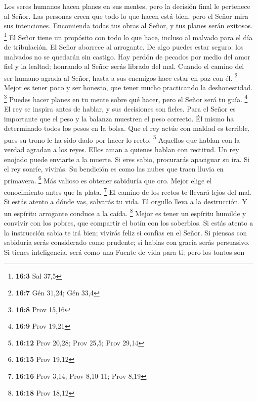  Los seres humanos hacen planes en sus mentes, pero la
decisión final le pertenece al Señor.  Las personas creen
que todo lo que hacen está bien, pero el Señor mira sus intenciones.
 Encomienda todas tus obras al Señor, y tus planes serán
exitosos. \footnote{\textbf{16:3} Sal 37,5}  El Señor tiene
un propósito con todo lo que hace, incluso al malvado para el día de
tribulación.  El Señor aborrece al arrogante. De algo puedes
estar seguro: los malvados no se quedarán sin castigo.  Hay
perdón de pecados por medio del amor fiel y la lealtad; honrando al
Señor serás librado del mal.  Cuando el camino del ser
humano agrada al Señor, hasta a sus enemigos hace estar en paz con él.
\footnote{\textbf{16:7} Gén 31,24; Gén 33,4}  Mejor es tener
poco y ser honesto, que tener mucho practicando la deshonestidad.
\footnote{\textbf{16:8} Prov 15,16}  Puedes hacer planes en
tu mente sobre qué hacer, pero el Señor será tu guía. \footnote{\textbf{16:9}
  Prov 19,21}  El rey se inspira antes de hablar, y sus
decisiones son fieles.  Para el Señor es importante que el
peso y la balanza muestren el peso correcto. Él mismo ha determinado
todos los pesos en la bolsa.  Que el rey actúe con maldad
es terrible, pues su trono le ha sido dado por hacer lo recto.
\footnote{\textbf{16:12} Prov 20,28; Prov 25,5; Prov 29,14}
 Aquellos que hablan con la verdad agradan a los reyes.
Ellos aman a quienes hablan con rectitud.  Un rey enojado
puede enviarte a la muerte. Si eres sabio, procurarás apaciguar su ira.
 Si el rey sonríe, vivirás. Su bendición es como las nubes
que traen lluvia en primavera. \footnote{\textbf{16:15} Prov 19,12}
 Más valioso es obtener sabiduría que oro. Mejor elige el
conocimiento antes que la plata. \footnote{\textbf{16:16} Prov 3,14;
  Prov 8,10-11; Prov 8,19}  El camino de los rectos te
llevará lejos del mal. Si estás atento a dónde vas, salvarás tu vida.
 El orgullo lleva a la destrucción. Y un espíritu arrogante
conduce a la caída. \footnote{\textbf{16:18} Prov 18,12} 
Mejor es tener un espíritu humilde y convivir con los pobres, que
compartir el botín con los soberbios.  Si estás atento a la
instrucción sabia te irá bien; vivirás feliz si confías en el Señor.
 Si piensas con sabiduría serás considerado como prudente;
si hablas con gracia serás persuasivo.  Si tienes
inteligencia, será como una Fuente de vida para ti; pero los tontos son
